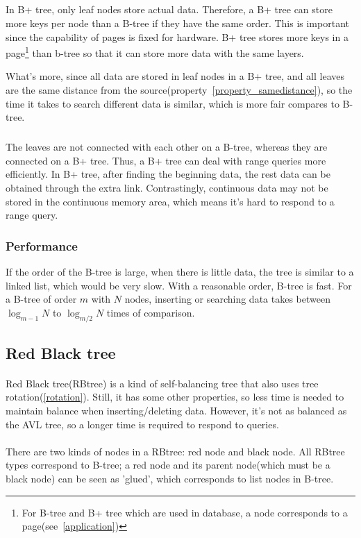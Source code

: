 \documentclass{article}
\begin{document}
\subparagraph{}
In B+ tree, only leaf nodes store actual data. Therefore, a B+ tree can store more keys per node than a B-tree if they have the same order. This is important since the capability of pages is fixed for hardware. B+ tree stores more keys in a page\footnote{For B-tree and B+ tree which are used in database, a node corresponds to a page(see~\ref{application})}
than b-tree so that it can store more data with the same layers.

What's more, since all data are stored in leaf nodes in a B+ tree, and all leaves are the same distance from the source(property~\ref{property_samedistance}), so the time it takes to search different data is similar, which is more fair compares to B-tree.

\subparagraph{}
The leaves are not connected with each other on a B-tree, whereas they are connected on a B+ tree. Thus, a B+ tree can deal with range queries more efficiently. In B+ tree, after finding the beginning data, the rest data can be obtained through the extra link. Contrastingly, continuous data may not be stored in the continuous memory area, which means it's hard to respond to a range query.


\subsubsection{Performance}
If the order of the B-tree is large, when there is little data, the tree is similar to a linked list, which would be very slow. With a reasonable order, B-tree is fast. For a B-tree of order $m$ with $N$ nodes, inserting or searching data takes between $\log_{m-1}N$ to $\log_{m/2}N$ times of comparison.


\newpage


\subsection{Red Black tree}

\paragraph{}
Red Black tree(RBtree) is a kind of self-balancing tree that also uses tree rotation(\ref{rotation}). Still, it has some other properties, so less time is needed to maintain balance when inserting/deleting data. However, it's not as balanced as the AVL tree, so a longer time is required to respond to queries.

\paragraph{}
There are two kinds of nodes in a RBtree: red node and black node. All RBtree types correspond to B-tree; a red node and its parent node(which must be a black node) can be seen as 'glued', which corresponds to list nodes in B-tree.
\end{document}
